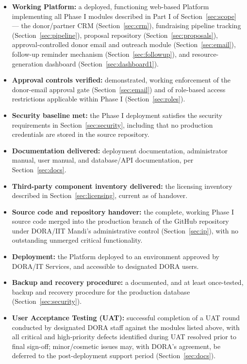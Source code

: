 \documentclass[11pt]{article}
\begin{document}
\begin{itemize}[leftmargin=1.4em, itemsep=4pt]
\item \textbf{Working Platform:} a deployed, functioning web-based Platform implementing all Phase I modules described in Part I of Section~\ref{sec:scope} --- the donor/partner CRM (Section~\ref{sec:crm}), fundraising pipeline tracking (Section~\ref{sec:pipeline}), proposal repository (Section~\ref{sec:proposals}), approval-controlled donor email and outreach module (Section~\ref{sec:email}), follow-up reminder mechanism (Section~\ref{sec:followup}), and resource-generation dashboard (Section~\ref{sec:dashboard1}).
\item \textbf{Approval controls verified:} demonstrated, working enforcement of the donor-email approval gate (Section~\ref{sec:email}) and of role-based access restrictions applicable within Phase I (Section~\ref{sec:roles}).
\item \textbf{Security baseline met:} the Phase I deployment satisfies the security requirements in Section~\ref{sec:security}, including that no production credentials are stored in the source repository.
\item \textbf{Documentation delivered:} deployment documentation, administrator manual, user manual, and database/API documentation, per Section~\ref{sec:docs}.
\item \textbf{Third-party component inventory delivered:} the licensing inventory described in Section~\ref{sec:licensing}, current as of handover.
\item \textbf{Source code and repository handover:} the complete, working Phase I source code merged into the production branch of the GitHub repository under DORA/IIT Mandi's administrative control (Section~\ref{sec:ip}), with no outstanding unmerged critical functionality.
\item \textbf{Deployment:} the Platform deployed to an environment approved by DORA/IT Services, and accessible to designated DORA users.
\item \textbf{Backup and recovery procedure:} a documented, and at least once-tested, backup and recovery procedure for the production database (Section~\ref{sec:security}).
\item \textbf{User Acceptance Testing (UAT):} successful completion of a UAT round conducted by designated DORA staff against the modules listed above, with all critical and high-priority defects identified during UAT resolved prior to final sign-off; minor/cosmetic issues may, with DORA's agreement, be deferred to the post-deployment support period (Section~\ref{sec:docs}).
\end{itemize}
\end{document}
